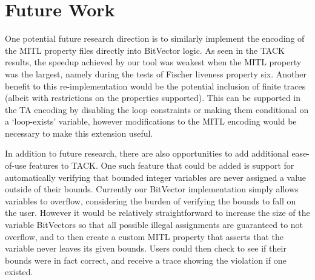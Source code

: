 \documentclass[a4paper,11pt]{report}
\theoremstyle{definition}
\begin{document}
\section{Future Work}

One potential future research direction is to similarly implement the encoding
of the MITL property files directly into BitVector logic. As seen in the TACK
results, the speedup achieved by our tool was weakest when the MITL property was
the largest, namely during the tests of Fischer liveness property six. Another
benefit to this re-implementation would be the potential inclusion of finite
traces (albeit with restrictions on the properties supported). This can be
supported in the TA encoding by disabling the loop constraints or making them
conditional on a `loop-exists' variable, however modifications to the MITL
encoding would be necessary to make this extension useful.

In addition to future research, there are also opportunities to add additional
ease-of-use features to TACK\@. One such feature that could be added is support
for automatically verifying that bounded integer variables are never assigned a
value outside of their bounds. Currently our BitVector implementation simply
allows variables to overflow, considering the burden of verifying the bounds to
fall on the user. However it would be relatively straightforward to increase the
size of the variable BitVectors so that all possible illegal assignments are
guaranteed to not overflow, and to then create a custom MITL property that
asserts that the variable never leaves its given bounds. Users could then check
to see if their bounds were in fact correct, and receive a trace showing the
violation if one existed.

\newpage



\end{document}
